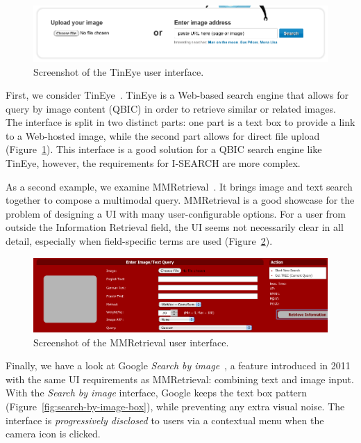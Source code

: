 \documentclass[runningheads,a4paper]{llncs} \usepackage[utf8]{inputenc}
\begin{document}
\begin{figure}[h!]
  \centering
    \includegraphics[width=0.6\linewidth]{resources/tineye-UI.png}
  \caption{Screenshot of the TinEye user interface.}
  \label{fig:tineye-ui}
\end{figure}

First, we consider TinEye~\cite{tineye}. TinEye is a Web-based search engine that allows for query by image content (QBIC) in order to retrieve similar or related images. The interface is split in two distinct parts: one part is a text box to provide a link to a Web-hosted image, while the second part allows for direct file upload (Figure~\ref{fig:tineye-ui}). This interface is a good solution for a QBIC search engine like TinEye, however, the requirements for \mbox{I-SEARCH} are more complex.

As a second example, we examine MMRetrieval~\cite{mmretrieval}. It brings image and text search together to compose a multimodal query. MMRetrieval is a good showcase for the problem of designing a UI with many user-configurable options. For a user from outside the Information Retrieval field, the UI seems not necessarily clear in all detail, especially when field-specific terms are used (Figure~\ref{fig:mmretrieval-ui}).

\begin{figure}[h!]
  \centering
    \includegraphics[width=0.7\linewidth]{resources/mmretrieval-UI.png}
  \caption{Screenshot of the MMRetrieval user interface.}
  \label{fig:mmretrieval-ui}
\end{figure}

Finally, we have a look at Google \textit{Search by image}~\cite{searchbyimage}, a feature introduced in 2011 with the same UI requirements as MMRetrieval: combining text and image input. With the \textit{Search by image} interface, Google keeps the text box pattern (Figure~\ref{fig:search-by-image-box}), while preventing any extra visual noise. The interface is \emph{progressively disclosed} to users via a contextual menu when the camera icon is clicked.
\end{document}
